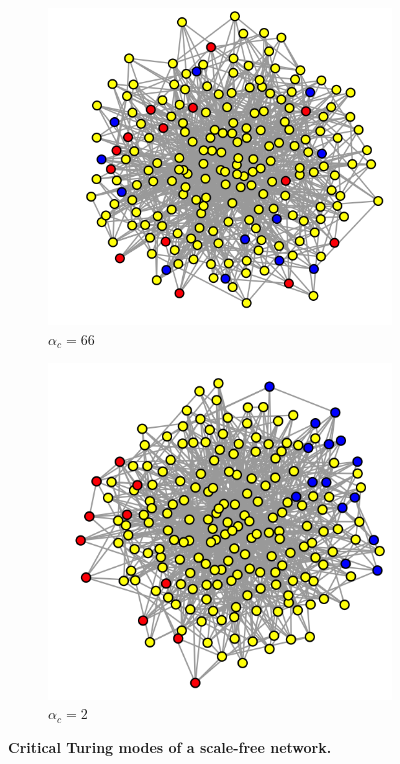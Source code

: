 \begin{figure}[H]
  \begin{subfigure}{0.33\textwidth}
    \centering
    \includegraphics[width=\linewidth]{Graphs/Model2_phi66_network.png}
    \caption{\(\alpha_c=66\)}
  \end{subfigure}\hfill
  \begin{subfigure}{0.33\textwidth}
    \centering
    \includegraphics[width=\linewidth]{Graphs/Model2_phi2_network.png}
    \caption{\(\alpha_c=2\)}
  \end{subfigure}

  \caption{\textbf{Critical Turing modes of a scale-free network.}}
  \label{fig:sch_critical}
\end{figure}

